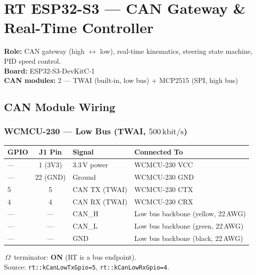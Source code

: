 \documentclass[12pt,a4paper,oneside]{report}
\newcommand{\bitrate}[1]{\ensuremath{#1\,\text{kbit/s}}}
\begin{document}

\chapter{RT ESP32-S3 --- CAN Gateway \& Real-Time Controller}

\textbf{Role:} CAN gateway (high $\leftrightarrow$ low), real-time kinematics, steering state machine, PID speed control.\\
\textbf{Board:} ESP32-S3-DevKitC-1\\
\textbf{CAN modules:} 2 --- TWAI (built-in, low bus) + MCP2515 (SPI, high bus)

\section{CAN Module Wiring}

\subsection{WCMCU-230 --- Low Bus (TWAI, \bitrate{500})}

\begin{center}
\begin{tabular}{lcll}
\toprule
\textbf{GPIO} & \textbf{J1 Pin} & \textbf{Signal} & \textbf{Connected To} \\
\midrule
--- & 1 (3V3)  & 3.3\,V power & WCMCU-230 VCC \\
--- & 22 (GND) & Ground       & WCMCU-230 GND \\
5   & 5        & CAN TX (TWAI)& WCMCU-230 CTX \\
4   & 4        & CAN RX (TWAI)& WCMCU-230 CRX \\
--- & ---      & CAN\_H        & Low bus backbone (yellow, 22\,AWG) \\
--- & ---      & CAN\_L        & Low bus backbone (green, 22\,AWG) \\
--- & ---      & GND          & Low bus backbone (black, 22\,AWG) \\
\bottomrule
\end{tabular}
\end{center}

\,$\Omega$\ terminator: \textbf{ON} (RT is a bus endpoint).\\
Source: \texttt{rt::kCanLowTxGpio=5}, \texttt{rt::kCanLowRxGpio=4}.
\end{document}
